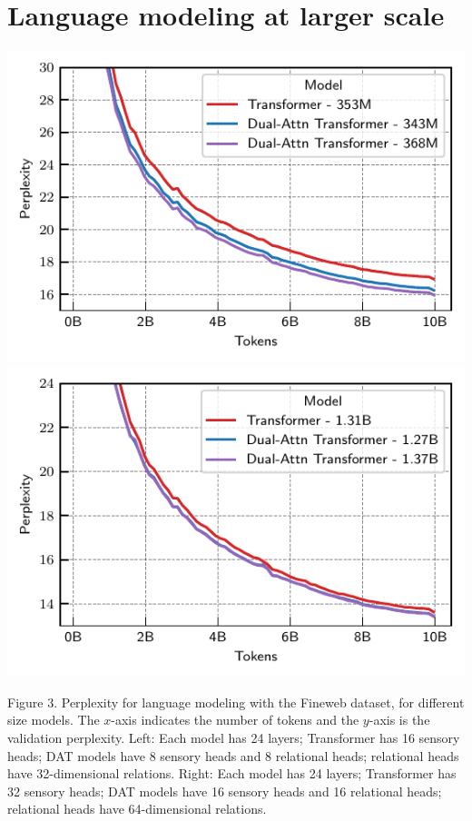 \documentclass[a0,landscape,pdftex]{a0poster}
\begin{document}
\begin{minipage}{55cm}

\section*{Language modeling at larger scale}

\includegraphics[width=.50\textwidth]{../figs/experiments/fineweb/350M_scale_lm.pdf}
\includegraphics[width=.50\textwidth]{../figs/experiments/fineweb/1_3B_scale_lm.pdf}

{Figure 3. Perplexity for language modeling with the Fineweb dataset, for different size models. The $x$-axis indicates the number of tokens and the $y$-axis is the validation perplexity. Left: Each model has 24 layers; Transformer has 16 sensory heads; DAT models have 8 sensory heads and 8 relational heads; relational heads have 32-dimensional relations. Right: Each model has 24 layers; Transformer has 32 sensory heads; DAT models have 16 sensory heads and 16 relational heads; relational heads have 64-dimensional relations.}


\end{minipage}
\end{document}
